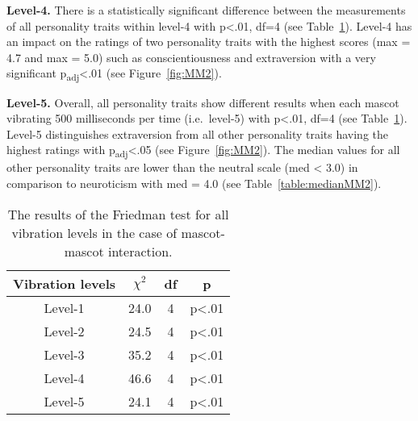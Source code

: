 \par\textbf{Level-4.}
There is a statistically significant difference between the measurements of all personality traits
within level-4 with p<.01, df=4 (see Table~\ref{table:friedmanMM2}).
Level-4 has an impact on the ratings of two personality traits with the highest scores (max = 4.7 and max = 5.0)
such as conscientiousness and extraversion
with a very significant p\textsubscript{adj}<.01 (see Figure~\ref{fig:MM2}).

\par\textbf{Level-5.}
Overall, all personality traits show different results when each mascot vibrating 500 milliseconds
per time (i.e.\ level-5) with p<.01, df=4 (see Table~\ref{table:friedmanMM2}).
Level-5 distinguishes extraversion from all other personality traits having the
highest ratings with p\textsubscript{adj}<.05 (see Figure~\ref{fig:MM2}).
The median values for all other personality traits are lower than the neutral scale (med < 3.0)
in comparison to neuroticism with med = 4.0 (see Table~\ref{table:medianMM2}).

\begin{table}[hbt!]
    \renewcommand{\arraystretch}{1}
    \begin{center}
        \begin{tabular}{|c|c|c|c|}
            \hline
            \textbf{Vibration levels} & \textbf{$\chi^2$} & \textbf{df} & \textbf{p} \\
            \hline
            Level-1 &24.0 &4 &p<.01 \\
            \hline
            Level-2 &24.5 &4 &p<.01 \\
            \hline
            Level-3 &35.2 &4 &p<.01 \\
            \hline
            Level-4 &46.6 &4 &p<.01 \\
            \hline
            Level-5 &24.1 &4 &p<.01 \\
            \hline
        \end{tabular}
        \caption{The results of the Friedman test for all vibration levels in the case of mascot-mascot interaction.}
        \label{table:friedmanMM2}
    \end{center}
\end{table}

